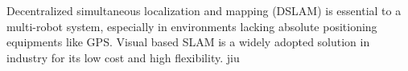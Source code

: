 Decentralized simultaneous localization and mapping (DSLAM) is essential to a multi-robot system, especially in environments lacking absolute positioning equipments like GPS. Visual based SLAM is a widely adopted solution in industry for its low cost and high flexibility. jiu